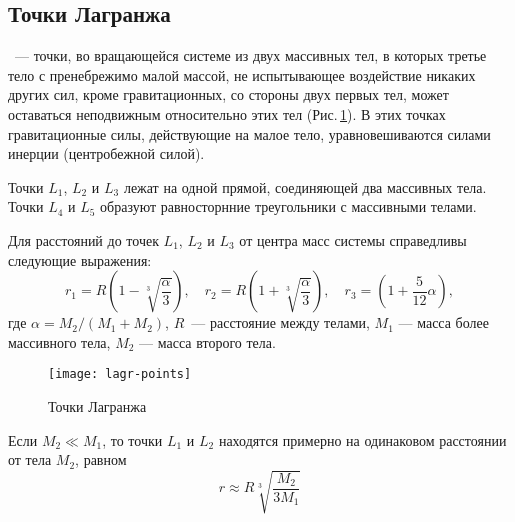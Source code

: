\subsection{Точки Лагранжа}

~--- точки, во вращающейся системе из двух
массивных тел, в которых третье тело с пренебрежимо 
малой массой, не испытывающее воздействие никаких 
других сил, кроме гравитационных, со стороны двух 
первых тел, может оставаться неподвижным относительно 
этих тел (Рис.\,\ref{pic:lagr-points}). В этих точках гравитационные силы, 
действующие на малое тело, уравновешиваются силами инерции (центробежной силой).

Точки $L_1$, $L_2$ и $L_3$ лежат на одной прямой, 
соединяющей два массивных тела. Точки $L_4$ и $L_5$ 
образуют равносторнние треугольники с массивными 
телами.

Для расстояний до точек $L_1$, $L_2$ и $L_3$ от 
центра масс системы справедливы следующие выражения:
\begin{equation}r_1=R\left(1-\sqrt[3]{\frac{\alpha}
{3}}\right), \quad r_2=R\left(1+\sqrt[3]{\frac{\alpha}
{3}}\right), \quad r_3=\left(1+\frac{5}{12}\alpha\right),
\end{equation}
где $\alpha=M_2 / (M_1 + M_2)$, $R$~--- расстояние между 
телами, $M_1$ --- масса более массивного тела, $M_2$
 --- масса второго тела.
\begin{figure}[h!]
\centering
\texttt{[image: lagr-points]}
\caption{Точки Лагранжа}\label{pic:lagr-points}
\end{figure}

Если $M_2 \ll M_1$, то точки $L_1$ и $L_2$ находятся 
примерно на одинаковом расстоянии от тела $M_2$, равном
\begin{equation}
r\approx R\sqrt[3]{\frac{M_2}{3M_1}}
\end{equation}
